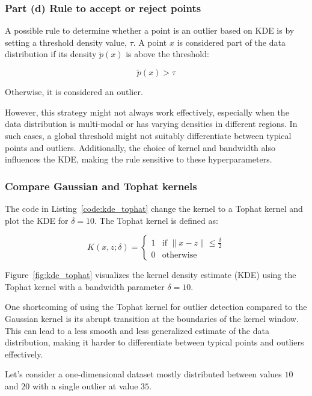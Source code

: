 \documentclass{article}
\begin{document}
\subsubsection*{Part (d) Rule to accept or reject points }

A possible rule to determine whether a point is an outlier based on KDE is by setting a threshold density value, \( \tau \). A point \( x \) is considered part of the data distribution if its density \( \tilde{p}(x) \) is above the threshold:

\[
\tilde{p}(x) > \tau
\]

Otherwise, it is considered an outlier. 

However, this strategy might not always work effectively, especially when the data distribution is multi-modal or has varying densities in different regions. In such cases, a global threshold might not suitably differentiate between typical points and outliers. Additionally, the choice of kernel and bandwidth also influences the KDE, making the rule sensitive to these hyperparameters.

\subsubsection*{Compare Gaussian and Tophat kernels}

The code in Listing~\ref{code:kde_tophat} change the kernel to a Tophat kernel and plot the KDE for \( \delta = 10 \). The Tophat kernel is defined as:

\[
K(x, z; \delta) = 
\begin{cases} 
1 & \text{if } \|x-z\| \leq \frac{\delta}{2} \\
0 & \text{otherwise}
\end{cases}
\]

Figure~\ref{fig:kde_tophat} visualizes the kernel density estimate (KDE) using the Tophat kernel with a bandwidth parameter \( \delta = 10 \).

One shortcoming of using the Tophat kernel for outlier detection compared to the Gaussian kernel is its abrupt transition at the boundaries of the kernel window. This can lead to a less smooth and less generalized estimate of the data distribution, making it harder to differentiate between typical points and outliers effectively.

Let's consider a one-dimensional dataset mostly distributed between values \(10\) and \(20\) with a single outlier at value \(35\). 
\end{document}
